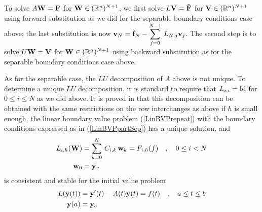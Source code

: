To solve $A \mathbf{W} = \mathbf{F}$ for $\mathbf{W} \in (\mathbb{R}^n)^{N+1}$, we first solve
$L\mathbf{V} = \tilde{\mathbf{F}}$ for $\mathbf{V} \in (\mathbb{R}^n)^{N+1}$ using forward
substitution as we did for the separable boundary conditions case
above; the last substitution is now
$\displaystyle \mathbf{v}_N = \tilde{\mathbf{f}}_N
-\sum_{j=0}^{N-1}\, L_{N,j} \mathbf{v}_j$.
The second step is to solve $U\mathbf{W} =\mathbf{V}$ for $\mathbf{W} \in (\mathbb{R}^n)^{N+1}$
using backward substitution as for the separable boundary conditions
case above.

As for the separable case, the $LU$ decomposition of $A$ above is not
unique.  To determine a unique $LU$ decomposition, it is standard to
require that $L_{i,i} = \operatorname{Id}$ for $0\leq i \leq N$ as we did above.
It is proved in \cite{K} that this decomposition can be obtained with the same
restrictions on the row interchanges as above if $h$ is small enough,
the linear boundary value problem (\ref{LinBVPrepeat}) with the
boundary conditions expressed as in (\ref{LinBVPpartSep}) has a unique
solution, and
\begin{align*}
L_{i,h}(\mathbf{W}) &= \sum_{k=0}^N\,C_{i,k}\,\mathbf{w}_k =
F_{i,h}(f) \quad , \quad 0 \leq i < N \\
\mathbf{w}_0 &= \mathbf{y}_v
\end{align*}
is consistent and stable for the initial value problem
\begin{align*}
L(\mathbf{y}(t)) &= \mathbf{y}'(t) - A(t)\mathbf{y}(t) = f(t) \quad , \quad
a \leq t \leq b \\
\mathbf{y}(a) &= \mathbf{y}_c
\end{align*}

